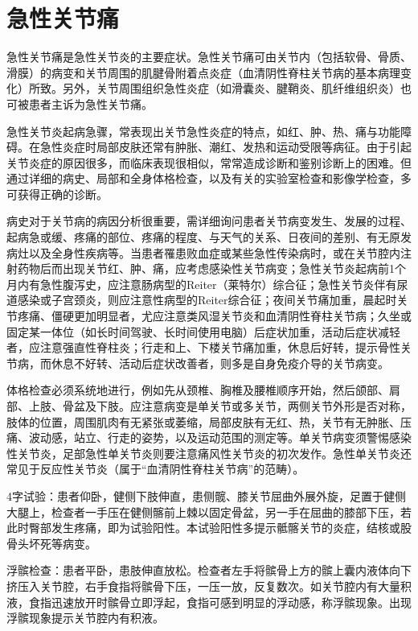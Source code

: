 \chapter{急性关节痛}

急性关节痛是急性关节炎的主要症状。急性关节痛可由关节内（包括软骨、骨质、滑膜）的病变和关节周围的肌腱骨附着点炎症（血清阴性脊柱关节病的基本病理变化）所致。另外，关节周围组织急性炎症（如滑囊炎、腱鞘炎、肌纤维组织炎）也可被患者主诉为急性关节痛。

急性关节炎起病急骤，常表现出关节急性炎症的特点，如红、肿、热、痛与功能障碍。在急性炎症时局部皮肤还常有肿胀、潮红、发热和运动受限等病征。由于引起关节炎症的原因很多，而临床表现很相似，常常造成诊断和鉴别诊断上的困难。但通过详细的病史、局部和全身体格检查，以及有关的实验室检查和影像学检查，多可获得正确的诊断。

病史对于关节病的病因分析很重要，需详细询问患者关节病变发生、发展的过程、起病急或缓、疼痛的部位、疼痛的程度、与天气的关系、日夜间的差别、有无原发病灶以及全身性疾病等。当患者罹患败血症或某些急性传染病时，或在关节腔内注射药物后而出现关节红、肿、痛，应考虑感染性关节病变；急性关节炎起病前1个月内有急性腹泻史，应注意肠病型的Reiter（莱特尔）综合征；急性关节炎伴有尿道感染或子宫颈炎，则应注意性病型的Reiter综合征；夜间关节痛加重，晨起时关节疼痛、僵硬更加明显者，尤应注意类风湿关节炎和血清阴性脊柱关节病；久坐或固定某一体位（如长时间驾驶、长时间使用电脑）后症状加重，活动后症状减轻者，应注意强直性脊柱炎；行走和上、下楼关节痛加重，休息后好转，提示骨性关节病，而休息不好转、活动后症状改善者，则多是自身免疫介导的关节病变。

体格检查必须系统地进行，例如先从颈椎、胸椎及腰椎顺序开始，然后颌部、肩部、上肢、骨盆及下肢。应注意病变是单关节或多关节，两侧关节外形是否对称，肢体的位置，周围肌肉有无紧张或萎缩，局部皮肤有无红、热，关节有无肿胀、压痛、波动感，站立、行走的姿势，以及运动范围的测定等。单关节病变须警惕感染性关节炎，足部急性单关节炎则要注意痛风性关节炎的初次发作。急性单关节炎还常见于反应性关节炎（属于“血清阴性脊柱关节病”的范畴）。

4字试验：患者仰卧，健侧下肢伸直，患侧髋、膝关节屈曲外展外旋，足置于健侧大腿上，检查者一手压在健侧髂前上棘以固定骨盆，另一手在屈曲的膝部下压，若此时臀部发生疼痛，即为试验阳性。本试验阳性多提示骶髂关节的炎症，结核或股骨头坏死等病变。

浮髌检查：患者平卧，患肢伸直放松。检查者左手将髌骨上方的髌上囊内液体向下挤压入关节腔，右手食指将髌骨下压，一压一放，反复数次。如关节腔内有大量积液，食指迅速放开时髌骨立即浮起，食指可感到明显的浮动感，称浮髌现象。出现浮髌现象提示关节腔内有积液。

